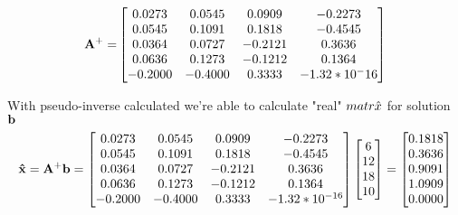 \begin{equation*}
    \mathbf{A^+ = }
    \begin{bmatrix}
        0.0273  &  0.0545  &  0.0909  & -0.2273 \\
        0.0545  &  0.1091  &  0.1818  & -0.4545 \\
        0.0364  &  0.0727  & -0.2121  &  0.3636 \\
        0.0636  &  0.1273  & -0.1212  &  0.1364 \\
        -0.2000 &  -0.4000 &   0.3333 &  -1.32 * 10^-16 \\
    \end{bmatrix}
\end{equation*}

With pseudo-inverse calculated we're able to calculate "real" $\\matr{\hat{x}}$ for solution $\mathbf{b}$
\begin{equation*}
    \mathbf{\hat{x}} = \mathbf{A^+}\mathbf{b} = 
    \begin{bmatrix}
        0.0273  &  0.0545  &  0.0909  & -0.2273 \\
        0.0545  &  0.1091  &  0.1818  & -0.4545 \\
        0.0364  &  0.0727  & -0.2121  &  0.3636 \\
        0.0636  &  0.1273  & -0.1212  &  0.1364 \\
        -0.2000 &  -0.4000 &   0.3333 &  -1.32 * 10^{-16} \\
    \end{bmatrix}
    \begin{bmatrix}
        6 \\
        12 \\
        18 \\
        10
    \end{bmatrix} =
    \begin{bmatrix}
        0.1818 \\ 
        0.3636 \\
        0.9091 \\
        1.0909 \\
        0.0000
    \end{bmatrix}
\end{equation*}

